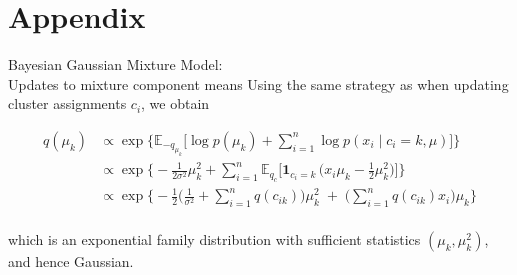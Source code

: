 \documentclass[10pt]{beamer}
\numberwithin{equation}{section}
\theoremstyle{definition}
\newcommand{\ds}{\displaystyle}
\newcommand{\df}{\displaystyle\frac}
\newcommand{\+}[1]{\ensuremath{{\boldsymbol #1}}} %
\newcommand{\cond}{\; | \;}
\newcommand{\E}{\mathbb{E}}
\begin{document}
\section{Appendix} 

\begin{frame}{Bayesian Gaussian Mixture Model: \\ Updates to mixture component means}
Using the same strategy as when updating cluster assignments $c_i$, we obtain

\begin{align*}
q(\mu_k) & \propto \exp \bigg\{ \E_{-q_{\mu_k}} \bigg[  \log p(\mu_k) + \ds\sum_{i=1}^n \log p(x_i \cond c_i=k, \mu) \bigg] \bigg\} \\
& \propto \exp \bigg\{ -\df{1}{2  \sigma^2} \mu_k^2 +  \ds\sum_{i=1}^{n} \E_{q_c} \bigg[ \+1_{c_i=k}\, \bigg(x_i \mu_k - \df{1}{2} \mu_k^2\bigg) \bigg] \bigg\} \\
& \propto \exp \bigg\{ -\df{1}{2} \bigg(\df{1}{ \sigma^2} + \ds\sum_{i=1}^n q(c_{ik}) \bigg) \mu_k^2 \; +  \;  \bigg( \ds\sum_{i=1}^n q(c_{ik})x_i  \bigg) \mu_k \bigg\} \\
\end{align*}

which is an exponential family distribution with sufficient statistics $(\mu_k, \mu_k^2)$, and hence Gaussian.

\end{frame}
\end{document}
